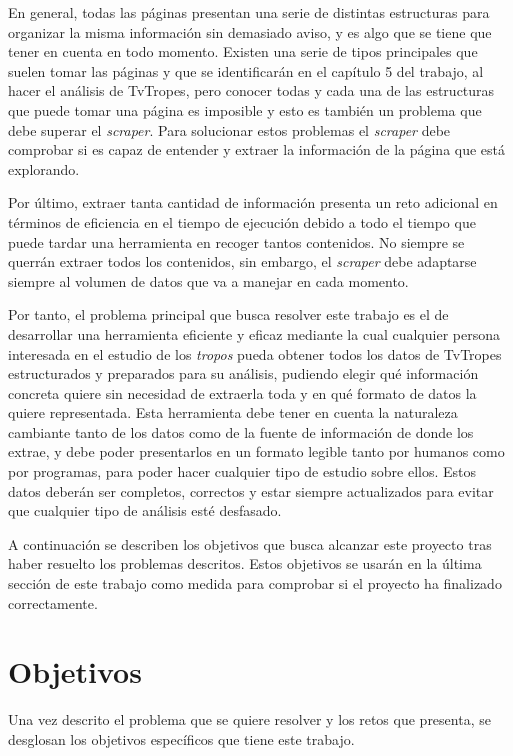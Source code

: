 En general, todas las páginas presentan una serie de distintas estructuras para
organizar la misma información sin demasiado aviso, y es algo que se tiene que
tener en cuenta en todo momento. Existen una serie de tipos principales que
suelen tomar las páginas y que se identificarán en el capítulo 5 del trabajo, al
hacer el análisis de TvTropes, pero conocer todas y cada una de las estructuras
que puede tomar una página es imposible y esto es también un problema que debe
superar el \textit{scraper}. Para solucionar estos problemas el \textit{scraper}
debe comprobar si es capaz de entender y extraer la información de la página que
está explorando. 

Por último, extraer tanta cantidad de información presenta un reto adicional en
términos de eficiencia en el tiempo de ejecución debido a todo el tiempo que
puede tardar una herramienta en recoger tantos contenidos. No siempre se querrán
extraer todos los contenidos, sin embargo, el \textit{scraper} debe adaptarse
siempre al volumen de datos que va a manejar en cada momento.

Por tanto, el problema principal que busca resolver este trabajo es el de
desarrollar una herramienta eficiente y eficaz mediante la cual cualquier
persona interesada en el estudio de los \textit{tropos} pueda obtener todos los
datos de TvTropes estructurados y preparados para su análisis, pudiendo elegir
qué información concreta quiere sin necesidad de extraerla toda y en qué formato
de datos la quiere representada. Esta herramienta debe tener en cuenta la
naturaleza cambiante tanto de los datos como de la fuente de información de
donde los extrae, y debe poder presentarlos en un formato legible tanto por
humanos como por programas, para poder hacer cualquier tipo de estudio sobre
ellos. Estos datos deberán ser completos, correctos y estar siempre actualizados
para evitar que cualquier tipo de análisis esté desfasado.

A continuación se describen los objetivos que busca alcanzar este proyecto tras
haber resuelto los problemas descritos. Estos objetivos se usarán en la última
sección de este trabajo como medida para comprobar si el proyecto ha finalizado
correctamente.

\section{Objetivos}
Una vez descrito el problema que se quiere resolver y los retos que presenta, se
desglosan los objetivos específicos que tiene este trabajo.

